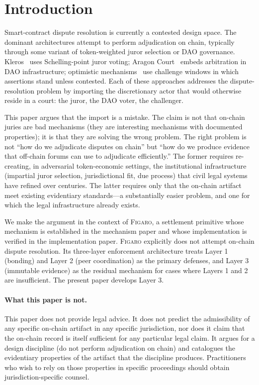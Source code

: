 \documentclass[11pt,a4paper]{article}
\theoremstyle{remark}
\newcommand{\figaro}{\textsc{Figaro}}
\begin{document}
\section{Introduction}
\label{sec:intro}

Smart-contract dispute resolution is currently a contested design
space. The dominant architectures attempt to perform adjudication
on chain, typically through some variant of token-weighted juror
selection or DAO governance. Kleros~\citep{kleros2019} uses
Schelling-point juror voting; Aragon Court~\citep{aragon2017}
embeds arbitration in DAO infrastructure; optimistic
mechanisms~\citep{optimism2021,uma2020} use challenge windows in
which assertions stand unless contested. Each of these
approaches addresses the dispute-resolution problem by importing
the discretionary actor that would otherwise reside in a court:
the juror, the DAO voter, the challenger.

This paper argues that the import is a mistake. The claim is not
that on-chain juries are bad mechanisms (they are interesting
mechanisms with documented properties); it is that they are
solving the wrong problem. The right problem is not ``how do we
adjudicate disputes on chain'' but ``how do we produce evidence
that off-chain forums can use to adjudicate efficiently.'' The
former requires re-creating, in adversarial token-economic
settings, the institutional infrastructure (impartial juror
selection, jurisdictional fit, due process) that civil legal
systems have refined over centuries. The latter requires only that
the on-chain artifact meet existing evidentiary standards---a
substantially easier problem, and one for which the legal
infrastructure already exists.

We make the argument in the context of \figaro{}, a settlement
primitive whose mechanism is established
in the mechanism paper and whose implementation is
verified in the implementation paper. \figaro{} explicitly does not
attempt on-chain dispute resolution. Its three-layer enforcement
architecture treats Layer 1 (bonding) and Layer 2 (peer
coordination) as the primary defenses, and Layer 3 (immutable
evidence) as the residual mechanism for cases where Layers 1 and
2 are insufficient. The present paper develops Layer 3.

\paragraph{What this paper is not.}
This paper does not provide legal advice. It does not predict the
admissibility of any specific on-chain artifact in any specific
jurisdiction, nor does it claim that the on-chain record is
itself sufficient for any particular legal claim. It argues for a
design discipline (do not perform adjudication on chain) and
catalogues the evidentiary properties of the artifact that the
discipline produces. Practitioners who wish to rely on those
properties in specific proceedings should obtain jurisdiction-specific
counsel.
\end{document}
